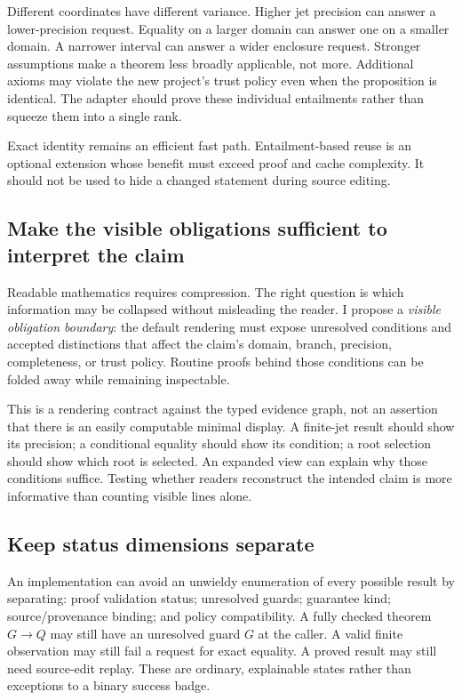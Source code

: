 \documentclass[11pt,letterpaper]{article}
\begin{document}
Different coordinates have different variance. Higher jet precision can answer
a lower-precision request. Equality on a larger domain can answer one on a
smaller domain. A narrower interval can answer a wider enclosure request.
Stronger assumptions make a theorem less broadly applicable, not more.
Additional axioms may violate the new project's trust policy even when the
proposition is identical. The adapter should prove these individual entailments
rather than squeeze them into a single rank.

Exact identity remains an efficient fast path. Entailment-based reuse is an
optional extension whose benefit must exceed proof and cache complexity. It
should not be used to hide a changed statement during source editing.

\subsection{Make the visible obligations sufficient to interpret the claim}
Readable mathematics requires compression. The right question is which
information may be collapsed without misleading the reader. I propose a
\emph{visible obligation boundary}: the default rendering must expose unresolved
conditions and accepted distinctions that affect the claim's domain, branch,
precision, completeness, or trust policy. Routine proofs behind those conditions
can be folded away while remaining inspectable.

This is a rendering contract against the typed evidence graph, not an assertion
that there is an easily computable minimal display. A finite-jet result should
show its precision; a conditional equality should show its condition; a root
selection should show which root is selected. An expanded view can explain why
those conditions suffice. Testing whether readers reconstruct the intended
claim is more informative than counting visible lines alone.

\subsection{Keep status dimensions separate}
An implementation can avoid an unwieldy enumeration of every possible result
by separating: proof validation status; unresolved guards; guarantee kind;
source/provenance binding; and policy compatibility. A fully checked theorem
\(G\to Q\) may still have an unresolved guard \(G\) at the caller. A valid
finite observation may still fail a request for exact equality. A proved result
may still need source-edit replay. These are ordinary, explainable states rather
than exceptions to a binary success badge.
\end{document}

